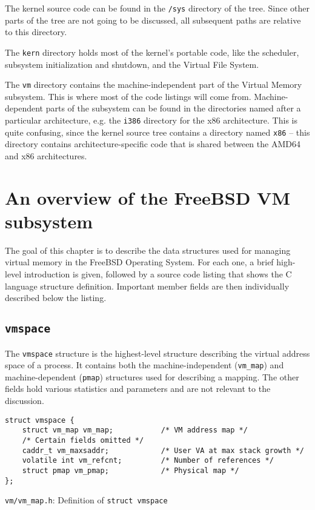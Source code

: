 \documentclass[shortabstract, english]{iithesis}
\begin{document}
The kernel source code can be found in the \texttt{/sys} directory of the tree.
Since other parts of the tree are not going to be discussed, all subsequent
paths are relative to this directory.

The \texttt{kern} directory holds most of the kernel's portable code, like the
scheduler, subsystem initialization and shutdown, and the Virtual File System.

The \texttt{vm} directory contains the machine-independent part of the Virtual
Memory subsystem. This is where most of the code listings will come from.
Machine-dependent parts of the subsystem can be found in the directories named
after a particular architecture, e.g. the \texttt{i386} directory for the x86
architecture. This is quite confusing, since the kernel source tree contains a
directory named \texttt{x86} -- this directory contains architecture-specific
code that is shared between the AMD64 and x86 architectures.

\chapter{An overview of the FreeBSD VM subsystem}

The goal of this chapter is to describe the data structures used for managing
virtual memory in the FreeBSD Operating System. For each one, a brief high-level
introduction is given, followed by a source code listing that shows the C
language structure definition. Important member fields are then individually
described below the listing.

\section{\texttt{vmspace}}

The \texttt{vmspace} structure is the highest-level structure describing the
virtual address space of a process. It contains both the machine-independent
(\texttt{vm_map}) and machine-dependent (\texttt{pmap}) structures used for
describing a mapping. The other fields hold various statistics and parameters
and are not relevant to the discussion.

\begin{listing}[H]
\begin{verbatim}
struct vmspace {
    struct vm_map vm_map;           /* VM address map */
    /* Certain fields omitted */
    caddr_t vm_maxsaddr;            /* User VA at max stack growth */
    volatile int vm_refcnt;         /* Number of references */
    struct pmap vm_pmap;            /* Physical map */
};
\end{verbatim}
\caption{\texttt{vm/vm\_map.h}: Definition of \texttt{struct vmspace}}
\end{listing}
\end{document}
